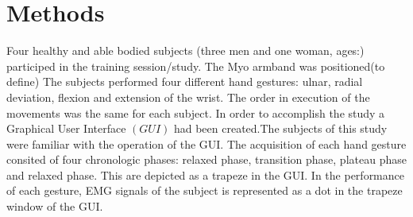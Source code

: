\section{Methods}

Four healthy and able bodied subjects (three men and one woman, ages:) participed in the training session/study. The Myo armband was positioned(to define)
The subjects performed four different hand gestures: ulnar, radial deviation, flexion and extension of the wrist. The order in execution of the movements was the same for each subject. In order to accomplish the study a Graphical User Interface $\left( GUI\right)$ had been created.The subjects of this study were familiar with the operation of the GUI. The acquisition of each hand gesture consited of four chronologic phases: relaxed phase, transition phase, plateau phase and relaxed phase. This are depicted as a trapeze in the GUI. In the performance of each gesture, EMG signals of the subject is represented as a dot in the trapeze window of the GUI.  

